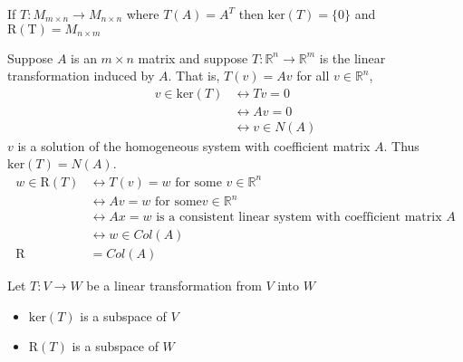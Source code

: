\documentclass[12pt]{article}
\begin{document}
 \begin{definition} If $T: M_{m \times n} \to M_{n \times n}$ where $T(A) = A^T$ then $\mathrm{ker}(T) = \{0\}$ and $\mathrm{R(T)} = M_{n \times m}$ \end{definition}
 \begin{definition} Suppose $A$ is an $m \times n$ matrix and suppose $T: \mathbb{R}^n \to \mathbb{R}^m$ is the linear transformation induced by $A$. \newline 
 That is, $T(v) = Av$ for all $v \in \mathbb{R}^n$, $$\begin{aligned} v \in \mathrm{ker}(T) &\leftrightarrow Tv = 0 \\ &\leftrightarrow Av = 0 \\ &\leftrightarrow v \in N(A) \end{aligned} $$ $v$ is a solution of the homogeneous system with coefficient matrix $A$. Thus $\mathrm{ker}(T) = N(A)$. $$\begin{aligned} w \in \mathrm{R}(T) &\leftrightarrow T(v) = w \text{ for some } v \in \mathbb{R}^n \\ &\leftrightarrow Av = w \text{ for some} v \in \mathbb{R}^n \\ &\leftrightarrow Ax = w \text{ is a consistent linear system with coefficient matrix } A \\ &\leftrightarrow w \in Col(A) \\ \mathrm{R} &= Col(A) \end{aligned} $$ \end{definition} 
 \begin{theorem} Let $T: V \to W$ be a linear transformation from $V$ into $W$ \begin{itemize} 
 \item $\mathrm{ker}(T)$ is a subspace of $V$ \item $\mathrm{R}(T)$ is a subspace of $W$ \end{itemize} \end{theorem} 
\end{document}
